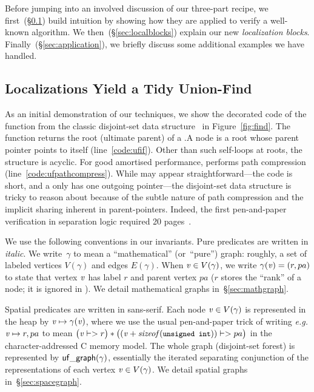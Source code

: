 Before jumping into an involved discussion of our three-part recipe, 
we first~(\S\ref{sec:unionfind}) build intuition by showing how 
they are applied to verify a well-known algorithm. 
We then~(\S\ref{sec:localblocks}) explain our new \emph{localization blocks}. 
Finally~(\S\ref{sec:application}), we briefly discuss some additional 
examples we have handled. 


\subsection{Localizations Yield a Tidy Union-Find}
\label{sec:unionfind}



As an initial demonstration of our techniques, we show the decorated code of the
 function from the classic disjoint-set data structure~\cite{clrs} in
Figure~\ref{fig:find}. The function returns the root
(ultimate parent) of a .\hspace{0.5em}A node is a root whose parent
pointer points to itself (line~\ref{code:ufif}).
Other than such self-loops at roots, the structure is acyclic.
For good amortised performance,  performs path
compression (line~\ref{code:ufpathcompress}).
While  may appear straightforward---the code is short, 
and a  only has one outgoing pointer---the
disjoint-set data structure is tricky to reason about 
because of the subtle nature of path compression and the
implicit sharing inherent in parent-pointers. Indeed, the first pen-and-paper
verification in separation logic required 20 pages~\cite{neelthesis}.

We use the following conventions in our invariants.  Pure predicates are written in
\textit{italic}.  We write~$\gamma$ to
mean a ``mathematical'' (or~``pure'') graph: roughly, a set of
labeled vertices $V(\gamma)$ and edges $E(\gamma)$.
When $\mathit{v} \in V(\gamma)$, we write $\gamma(\mathit{v}) = (r,pa)$ to state that vertex $\mathit{v}$ has
label $r$ and parent vertex $pa$ ($r$ stores the ``rank'' of a node; it is ignored
in ).  We detail mathematical graphs in~\S\ref{sec:mathgraph}.

Spatial predicates are written in \textsf{sans-serif}.
Each node $\mathit{v} \in V(\gamma)$ is
represented in the heap by $\mathit{v} \mapsto \gamma(\mathit{v})$, %
where we use the usual pen-and-paper
trick of writing \emph{e.g.} $\mathit{v} \mapsto r,pa$ to mean
\mbox{$\big(\m{v} |-> r\big) * \big((\m{v} + \m{sizeof}(\li{unsigned int})) |-> pa\big)$} in the character-addressed C memory model.
The whole graph (disjoint-set forest) is represented by
$\mathsf{uf\_graph}(\gamma)$, essentially the
iterated separating conjunction of the representations
of each vertex $\mathit{v} \in V(\gamma)$.
We detail spatial graphs in~\S\ref{sec:spacegraph}.

